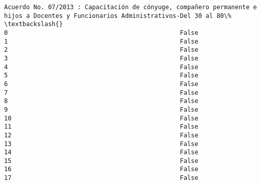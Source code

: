 \documentclass[11pt]{article}
\begin{document}
\begin{Verbatim}[commandchars=\\\{\}]
    Acuerdo No. 07/2013 : Capacitación de cónyuge, compañero permanente e hijos a Docentes y Funcionarios Administrativos-Del 30 al 80\%   \textbackslash{}
0                                               False                                                                                      
1                                               False                                                                                      
2                                               False                                                                                      
3                                               False                                                                                      
4                                               False                                                                                      
5                                               False                                                                                      
6                                               False                                                                                      
7                                               False                                                                                      
8                                               False                                                                                      
9                                               False                                                                                      
10                                              False                                                                                      
11                                              False                                                                                      
12                                              False                                                                                      
13                                              False                                                                                      
14                                              False                                                                                      
15                                              False                                                                                      
16                                              False                                                                                      
17                                              False                                                                                      

\end{Verbatim}
\end{document}
